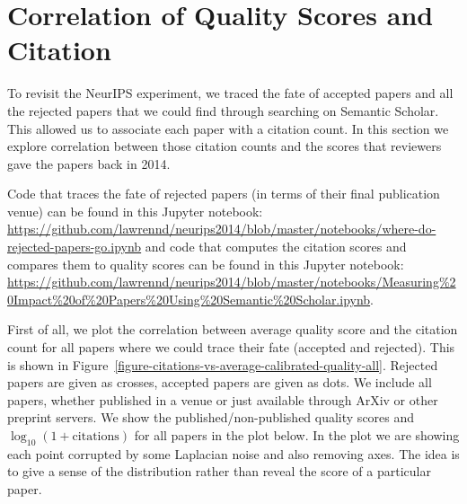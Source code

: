 \section{Correlation of Quality Scores and
Citation}\label{correlation-of-quality-scores-and-citation}

To revisit the NeurIPS experiment, we traced the fate of accepted papers and all the rejected papers that we could find through searching on Semantic Scholar. This allowed us to associate each paper with a citation count. In this section we explore correlation between those citation counts and the scores that reviewers gave the papers back in 2014.

Code that traces the fate of rejected papers (in terms of their final publication venue) can be found in this Jupyter notebook: \url{https://github.com/lawrennd/neurips2014/blob/master/notebooks/where-do-rejected-papers-go.ipynb} and code that computes the citation scores and compares them to quality scores can be found in this Jupyter notebook: \url{https://github.com/lawrennd/neurips2014/blob/master/notebooks/Measuring%20Impact%20of%20Papers%20Using%20Semantic%20Scholar.ipynb}.

First of all, we plot the correlation between average quality score and the citation count for all papers where we could trace their fate (accepted and rejected). This is shown in  Figure~\ref{figure-citations-vs-average-calibrated-quality-all}. Rejected papers are given as crosses,
accepted papers are given as dots. We include all papers, whether
published in a venue or just available through ArXiv or other preprint
servers. We show the published/non-published quality scores and
\(\log_{10}(1+\text{citations})\) for all papers in the plot below. In
the plot we are showing each point corrupted by some Laplacian noise and
also removing axes. The idea is to give a sense of the distribution
rather than reveal the score of a particular paper.

